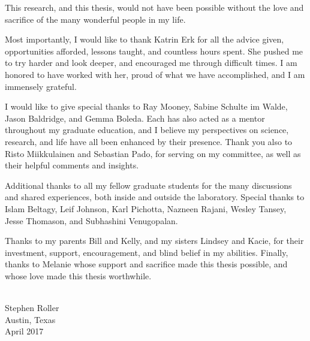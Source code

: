 This research, and this thesis, would not have been possible without the
love and sacrifice of the many wonderful people in my life.

Most importantly, I would like to thank Katrin Erk for all the advice given,
opportunities afforded, lessons taught, and countless hours spent. She pushed
me to try harder and look deeper, and encouraged me through difficult times.
I am honored to have worked with her, proud of what we have accomplished,
and I am immensely grateful.

I would like to give special thanks to Ray Mooney, Sabine Schulte im Walde,
Jason Baldridge, and Gemma Boleda. Each has also acted as a mentor throughout
my graduate education, and I believe my perspectives on science, research, and
life have all been enhanced by their presence. Thank you also to
Risto Miikkulainen and Sebastian Pado, for serving on my committee, as well
as their helpful comments and insights.

Additional thanks to all my fellow graduate students for the many discussions
and shared experiences, both inside and outside the laboratory. Special thanks
to Islam Beltagy, Leif Johnson, Karl Pichotta, Nazneen Rajani,
Wesley Tansey, Jesse Thomason, and Subhashini Venugopalan.

Thanks to my parents Bill and Kelly, and my sisters Lindsey and Kacie, for
their investment, support, encouragement, and blind belief in my abilities.
Finally, thanks to Melanie whose support and sacrifice made this
thesis possible, and whose love made this thesis worthwhile.

\begin{flushright}
~\\
Stephen Roller\\
Austin, Texas\\
April 2017
\end{flushright}
